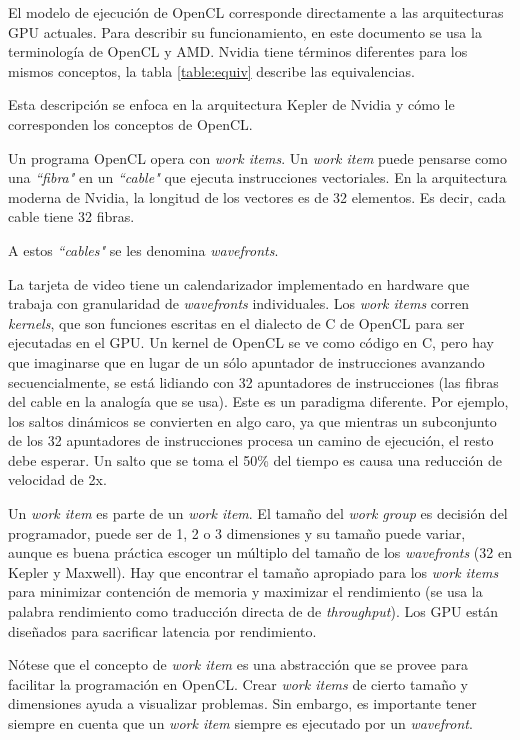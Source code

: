El modelo de ejecución de OpenCL corresponde directamente a las arquitecturas
GPU actuales. Para describir su funcionamiento, en este documento se usa la
terminología de OpenCL y AMD. Nvidia tiene términos diferentes para los mismos
conceptos, la tabla \ref{table:equiv} describe las equivalencias.

Esta descripción se enfoca en la arquitectura Kepler de Nvidia y cómo le
corresponden los conceptos de OpenCL.

Un programa OpenCL opera con \emph{work items}. Un \emph{work item} puede pensarse
como una \emph{``fibra"} en un \emph{``cable"} que ejecuta instrucciones
vectoriales. En la arquitectura moderna de Nvidia, la longitud de los
vectores es de 32 elementos. Es decir, cada cable tiene 32 fibras.

A estos \emph{``cables"} se les denomina \emph{wavefronts}.

La tarjeta de video tiene un calendarizador implementado en hardware que
trabaja con granularidad de \emph{wavefronts} individuales. Los \emph{work
items} corren \emph{kernels}, que son funciones escritas en el dialecto de C de
OpenCL para ser ejecutadas en el GPU. Un kernel de OpenCL se ve como código en
C, pero hay que imaginarse que en lugar de un sólo apuntador de instrucciones
avanzando secuencialmente, se está lidiando con 32 apuntadores de instrucciones
(las fibras del cable en la analogía que se usa). Este es un paradigma
diferente. Por ejemplo, los saltos dinámicos se convierten en algo caro, ya que
mientras un subconjunto de los 32 apuntadores de instrucciones procesa un
camino de ejecución, el resto debe esperar. Un salto que se toma el 50\% del
tiempo es causa una reducción de velocidad de 2x.

Un \emph{work item} es parte de un \emph{work item}. El tamaño del
\emph{work group} es decisión del programador, puede ser de 1, 2 o 3
dimensiones y su tamaño puede variar, aunque es buena práctica escoger un
múltiplo del tamaño de los \emph{ wavefronts } (32 en Kepler y Maxwell). Hay que
encontrar el tamaño apropiado para los \emph{work items} para minimizar
contención de memoria y maximizar el rendimiento (se usa la palabra rendimiento
como traducción directa de de \emph{throughput}). Los GPU están diseñados para
sacrificar latencia por rendimiento.

Nótese que el concepto de \emph{work item} es una abstracción que se
provee para facilitar la programación en OpenCL. Crear \emph{work items} de
cierto tamaño y dimensiones ayuda a visualizar problemas. Sin embargo, es
importante tener siempre en cuenta que un \emph{work item} siempre es ejecutado
por un \emph{wavefront}.

